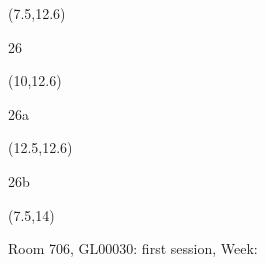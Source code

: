 \documentclass[a4paper]{article}
\newcommand{\myseat}[4]{%
\vspace{-0.1cm}
\parbox[t][2.2cm][t]{3.5cm}{
\small #1 %
\begin{description}
\vspace{-0.1cm}
\item [ID:] #2
\vspace{-0.1cm}
\item [Team:] #3 \normalsize
\vspace{-0.1cm}
\item \normalsize #4
\vspace{-0.1cm}
\end{description}
}
}
\begin{document}
\begin{CJK}{UTF8}{cyberbit}
\begin{textblock}{2.5}(7.5,12.6)
\textblockcolor{}
\myseat{26}{}{}{}
\end{textblock}

\begin{textblock}{2.5}(10,12.6)
\textblockcolor{}
\myseat{26a}{}{}{}
\end{textblock}

\begin{textblock}{2.5}(12.5,12.6)
\textblockcolor{}
\myseat{26b}{}{}{}
\end{textblock}

\begin{textblock}{7.5}(7.5,14)
\textblockcolor{}
\parbox[t][2.2cm][t]{9.5cm}{%
\large Room 706, GL00030: first session, Week: 
}
\end{textblock}

\end{CJK}
\end{document}
